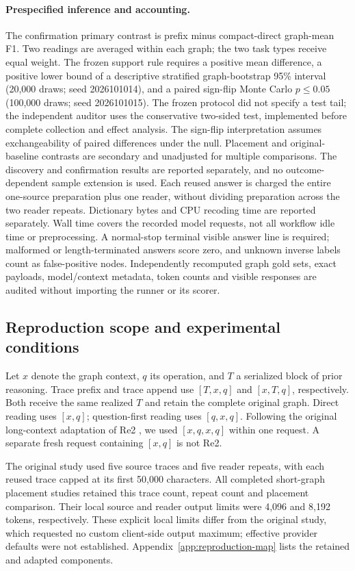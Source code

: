 \paragraph{Prespecified inference and accounting.} The confirmation primary contrast is prefix minus compact-direct graph-mean F1. Two readings are averaged within each graph; the two task types receive equal weight. The frozen support rule requires a positive mean difference, a positive lower bound of a descriptive stratified graph-bootstrap 95\% interval (20,000 draws; seed 2026101014), and a paired sign-flip Monte Carlo $p\leq0.05$ (100,000 draws; seed 2026101015). The frozen protocol did not specify a test tail; the independent auditor uses the conservative two-sided test, implemented before complete collection and effect analysis. The sign-flip interpretation assumes exchangeability of paired differences under the null. Placement and original-baseline contrasts are secondary and unadjusted for multiple comparisons. The discovery and confirmation results are reported separately, and no outcome-dependent sample extension is used. Each reused answer is charged the entire one-source preparation plus one reader, without dividing preparation across the two reader repeats. Dictionary bytes and CPU recoding time are reported separately. Wall time covers the recorded model requests, not all workflow idle time or preprocessing. A normal-stop terminal visible answer line is required; malformed or length-terminated answers score zero, and unknown inverse labels count as false-positive nodes. Independently recomputed graph gold sets, exact payloads, model/context metadata, token counts and visible responses are audited without importing the runner or its scorer.


\subsection{Reproduction scope and experimental conditions}
Let $x$ denote the graph context, $q$ its operation, and $T$ a serialized block of prior reasoning. Trace prefix and trace append use $[T,x,q]$ and $[x,T,q]$, respectively. Both receive the same realized $T$ and retain the complete original graph. Direct reading uses $[x,q]$; question-first reading uses $[q,x,q]$. Following the original long-context adaptation of Re2 \citep{tang2026trace,xu2024rereading}, we used $[x,q,x,q]$ within one request. A separate fresh request containing $[x,q]$ is not Re2.

The original study used five source traces and five reader repeats, with each reused trace capped at its first 50,000 characters. All completed short-graph placement studies retained this trace count, repeat count and placement comparison. Their local source and reader output limits were 4,096 and 8,192 tokens, respectively. These explicit local limits differ from the original study, which requested no custom client-side output maximum; effective provider defaults were not established. Appendix~\ref{app:reproduction-map} lists the retained and adapted components.

